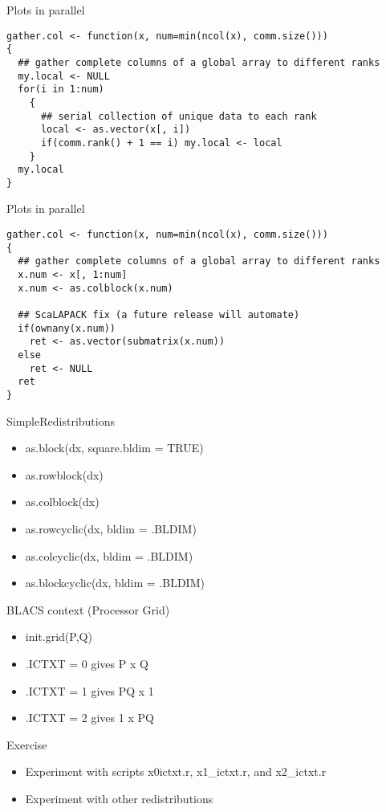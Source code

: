 \begin{frame}
  \begin{exampleblock}{Plots in parallel}\pause
\begin{lstlisting}[title=gather.col Second Attempt (p1\_plot.r)]
gather.col <- function(x, num=min(ncol(x), comm.size()))
{
  ## gather complete columns of a global array to different ranks
  my.local <- NULL
  for(i in 1:num)
    {
      ## serial collection of unique data to each rank
      local <- as.vector(x[, i])
      if(comm.rank() + 1 == i) my.local <- local
    }
  my.local
}
\end{lstlisting}
  \end{exampleblock}
\end{frame}

\begin{frame}
  \begin{exampleblock}{Plots in parallel}\pause
\begin{lstlisting}[title=gather.col The Right Way (p2\_plot.r)]
gather.col <- function(x, num=min(ncol(x), comm.size()))
{
  ## gather complete columns of a global array to different ranks
  x.num <- x[, 1:num]
  x.num <- as.colblock(x.num)

  ## ScaLAPACK fix (a future release will automate)
  if(ownany(x.num))
    ret <- as.vector(submatrix(x.num))
  else
    ret <- NULL
  ret
}
\end{lstlisting}
  \end{exampleblock}
\end{frame}


\begin{frame}
  \begin{block}{SimpleRedistributions}\pause
  \begin{itemize}
\item as.block(dx, square.bldim = TRUE)
\item as.rowblock(dx)
\item as.colblock(dx)
\item as.rowcyclic(dx, bldim = .BLDIM)
\item as.colcyclic(dx, bldim = .BLDIM)
\item as.blockcyclic(dx, bldim = .BLDIM)
  \end{itemize}
  \end{block}
  \begin{block}{BLACS context (Processor Grid)}\pause
  \begin{itemize}
\item init.grid(P,Q)
\item .ICTXT = 0 gives P x Q 
\item .ICTXT = 1 gives PQ x 1
\item .ICTXT = 2 gives 1 x PQ
  \end{itemize}
  \end{block}
\end{frame}

\begin{frame}
  \begin{block}{Exercise}\pause
  \begin{itemize}
  \item Experiment with scripts x0\-ictxt.r, x1\_ictxt.r, and x2\_ictxt.r
  \item Experiment with other redistributions
  \end{itemize}
  \end{block}
\end{frame}

